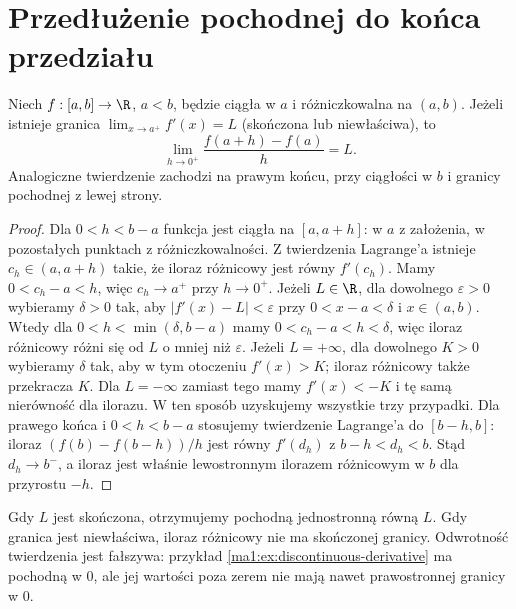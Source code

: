 \section{Przedłużenie pochodnej do końca przedziału}
\begin{twierdzenie}
\label{ma1:thm:derivative-endpoint-limit}
Niech $f:[a,b]\to\R$, $a<b$, będzie ciągła w $a$ i różniczkowalna na $(a,b)$. Jeżeli istnieje granica $\lim_{x\to a^+}f'(x)=L$ (skończona lub niewłaściwa), to
\[
 \lim_{h\to0^+}\frac{f(a+h)-f(a)}h=L.
\]
Analogiczne twierdzenie zachodzi na prawym końcu, przy ciągłości w $b$ i granicy pochodnej z lewej strony.
\end{twierdzenie}
\begin{proof}
Dla $0<h<b-a$ funkcja jest ciągła na $[a,a+h]$: w $a$ z założenia, w pozostałych punktach z różniczkowalności. Z twierdzenia Lagrange'a istnieje $c_h\in(a,a+h)$ takie, że iloraz różnicowy jest równy $f'(c_h)$. Mamy $0<c_h-a<h$, więc $c_h\to a^+$ przy $h\to0^+$. Jeżeli $L\in\R$, dla dowolnego $\varepsilon>0$ wybieramy $\delta>0$ tak, aby $|f'(x)-L|<\varepsilon$ przy $0<x-a<\delta$ i $x\in(a,b)$. Wtedy dla $0<h<\min(\delta,b-a)$ mamy $0<c_h-a<h<\delta$, więc iloraz różnicowy różni się od $L$ o mniej niż $\varepsilon$. Jeżeli $L=+\infty$, dla dowolnego $K>0$ wybieramy $\delta$ tak, aby w tym otoczeniu $f'(x)>K$; iloraz różnicowy także przekracza $K$. Dla $L=-\infty$ zamiast tego mamy $f'(x)<-K$ i tę samą nierówność dla ilorazu. W ten sposób uzyskujemy wszystkie trzy przypadki. Dla prawego końca i $0<h<b-a$ stosujemy twierdzenie Lagrange'a do $[b-h,b]$: iloraz $(f(b)-f(b-h))/h$ jest równy $f'(d_h)$ z $b-h<d_h<b$. Stąd $d_h\to b^-$, a iloraz jest właśnie lewostronnym ilorazem różnicowym w $b$ dla przyrostu $-h$.
\end{proof}
Gdy $L$ jest skończona, otrzymujemy pochodną jednostronną równą $L$. Gdy granica jest niewłaściwa, iloraz różnicowy nie ma skończonej granicy. Odwrotność twierdzenia jest fałszywa: przykład \ref{ma1:ex:discontinuous-derivative} ma pochodną w $0$, ale jej wartości poza zerem nie mają nawet prawostronnej granicy w $0$.
